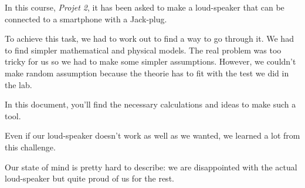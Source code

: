 

\begin{abstract-en}


In this course, \textit{Projet 2}, it has been asked to make a loud-speaker that can be connected to a smartphone with a Jack-plug.

To achieve this task, we had to work out to find a way to go through it.  We had to find simpler mathematical and physical models.  
The real problem was too tricky for us so we had to make some simpler assumptions.  However, we couldn't make random assumption because the theorie has to fit with the test we did in the lab.

In this document, you'll find the necessary calculations and ideas to make such a tool.

Even if our loud-speaker doesn't work as well as we wanted, we learned a lot from this challenge. 

Our state of mind is pretty hard to describe: we are disappointed with the actual loud-speaker but quite proud of us for the rest.


\end{abstract-en}


